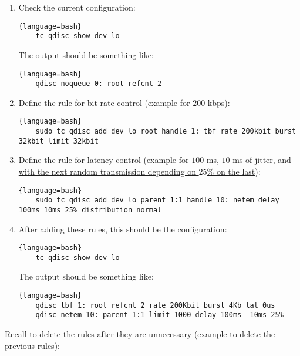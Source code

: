 \begin{enumerate}
\item Check the current configuration:
  
  \begin{lstlisting}{language=bash}
    tc qdisc show dev lo
  \end{lstlisting}
  
  The output should be something like:
  
  \begin{lstlisting}{language=bash}
    qdisc noqueue 0: root refcnt 2
  \end{lstlisting}
  
\item Define the rule for bit-rate control (example for $200$ kbps):
  
  \begin{lstlisting}{language=bash}
    sudo tc qdisc add dev lo root handle 1: tbf rate 200kbit burst 32kbit limit 32kbit
  \end{lstlisting}
  
\item Define the rule for latency control
  (example for $100$ ms, $10$ ms of jitter, and
  \href{https://wiki.linuxfoundation.org/networking/netem}{with the
    next random transmission depending on $25$\% on the last}):
  
  \begin{lstlisting}{language=bash}
    sudo tc qdisc add dev lo parent 1:1 handle 10: netem delay 100ms 10ms 25% distribution normal
  \end{lstlisting}
  
\item After adding these rules, this should be the configuration:
  
  \begin{lstlisting}{language=bash}
    tc qdisc show dev lo
  \end{lstlisting}
  
  The output should be something like:
  
  \begin{lstlisting}{language=bash}
    qdisc tbf 1: root refcnt 2 rate 200Kbit burst 4Kb lat 0us 
    qdisc netem 10: parent 1:1 limit 1000 delay 100ms  10ms 25%
  \end{lstlisting}

\end{enumerate}

Recall to delete the rules after they are unnecessary (example to delete the previous rules):

